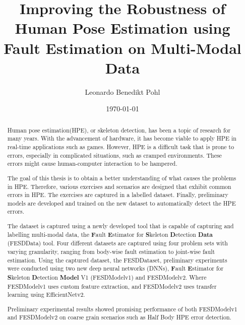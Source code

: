 
\title{Improving the Robustness of Human Pose Estimation using Fault Estimation on Multi-Modal Data}
\author{Leonardo Benedikt Pohl}
\date{\today}
 
\newlength{\originalVOffset}
\newlength{\originalHOffset}
\setlength{\originalVOffset}{\voffset}   
\setlength{\originalHOffset}{\hoffset}

\setlength{\voffset}{0cm}
\setlength{\hoffset}{0cm}

\setlength{\voffset}{\originalVOffset}
\setlength{\hoffset}{\originalHOffset}

\clearpage

\begin{abstract}
  Human pose estimation(HPE), or skeleton detection, has been a topic of research for many years. With the advancement of hardware, it has become viable to apply HPE in real-time applications such as games. However, HPE is a difficult task that is prone to errors, especially in complicated situations, such as cramped environments. These errors might cause human-computer interaction to be hampered.

  The goal of this thesis is to obtain a better understanding of what causes the problems in HPE. Therefore, various exercises and scenarios are designed that exhibit common errors in HPE. The exercises are captured in a labelled dataset. Finally, preliminary models are developed and trained on the new dataset to automatically detect the HPE errors.

  The dataset is captured using a newly developed tool that is capable of capturing and labelling multi-modal data, the \textbf{F}ault \textbf{E}stimator for \textbf{S}keleton \textbf{D}etection \textbf{Data} (FESDData) tool. Four different datasets are captured using four problem sets with varying granularity, ranging from body-wise fault estimation to joint-wise fault estimation. Using the captured dataset, the FESDDataset, preliminary experiments were conducted using two new deep neural networks (DNNs), \textbf{F}ault \textbf{E}stimator for \textbf{S}keleton \textbf{D}etection \textbf{Model} V1 (FESDModelv1) and FESDModelv2. Where FESDModelv1 uses custom feature extraction, and FESDModelv2 uses transfer learning using EfficientNetv2.

  Preliminary experimental results showed promising performance of both FESDModelv1 and FESDModelv2 on coarse grain scenarios such as Half Body HPE error detection.

  

\end{abstract}
